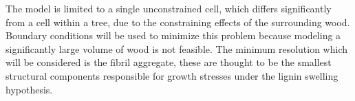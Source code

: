 The model is limited to a single unconstrained cell, which differs significantly
from a cell within a tree, due to the constraining effects of the surrounding
wood. Boundary conditions will be used to minimize this problem because modeling
a significantly large volume of wood is not feasible. The minimum resolution which
will be considered is the fibril aggregate, these are thought to be the smallest
structural components responsible for growth stresses under the lignin swelling
hypothesis.
